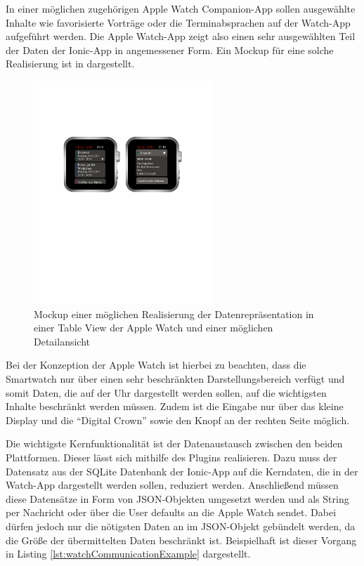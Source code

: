 In einer möglichen zugehörigen Apple Watch Companion-App sollen ausgewählte Inhalte wie favorisierte Vorträge oder die Terminabsprachen auf der Watch-App aufgeführt werden. Die Apple Watch-App zeigt also einen sehr ausgewählten Teil der Daten der Ionic-App in angemessener Form. Ein Mockup für eine solche Realisierung ist in  dargestellt. 

\begin{figure}[htb] 
	\centering
	\includegraphics[width=0.6\textwidth]{data/bilder/AppleWatchMockup.pdf}
	\caption{Mockup einer möglichen Realisierung der Datenrepräsentation in einer Table View der Apple Watch und einer möglichen Detailansicht}
	\label{fig:AppleWatchMockup}
\end{figure}

Bei der Konzeption der Apple Watch ist hierbei zu beachten, dass die Smartwatch nur über einen sehr beschränkten Darstellungsbereich verfügt und somit Daten, die auf der Uhr dargestellt werden sollen, auf die wichtigsten Inhalte beschränkt werden müssen. Zudem ist die Eingabe nur über das kleine Display und die \enquote{Digital Crown} sowie den Knopf an der rechten Seite möglich.

Die wichtigste Kernfunktionalität ist der Datenaustausch zwischen den beiden Plattformen.
Dieser lässt sich mithilfe des Plugins realisieren. Dazu muss der Datensatz aus der SQLite Datenbank der Ionic-App auf die Kerndaten, die in der Watch-App dargestellt werden sollen, reduziert werden. Anschließend müssen diese Datensätze in Form von JSON-Objekten umgesetzt werden und als String per Nachricht oder über die User defaults an die Apple Watch sendet. Dabei dürfen jedoch nur die nötigsten Daten an im JSON-Objekt gebündelt werden, da die Größe der übermittelten Daten beschränkt ist. Beispielhaft ist dieser Vorgang in Listing \ref{lst:watchCommunicationExample} dargestellt.

